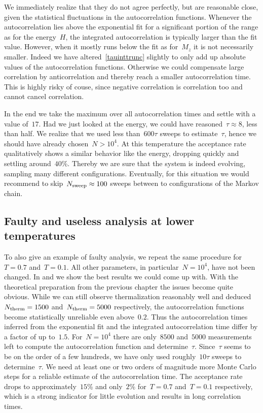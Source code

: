 We immediately realize that they do not agree perfectly, but are reasonable
close, given the statistical fluctuations in the autocorrelation functions.
Whenever the autocorrelation lies above the exponential fit for a significant
portion of the range as for the energy~$H$, the integrated autocorrelation is
typically larger than the fit value. However, when it mostly runs below the fit
as for~$M_z$ it is not necessarily smaller. Indeed we have
altered~\eqref{tauinttrunc} slightly to only add up absolute values of the
autocorrelation functions. Otherwise we could compensate large correlation by
anticorrelation and thereby reach a smaller autocorrelation time. This is highly
risky of couse, since negative correlation is correlation too and cannot cancel
correlation.

In the end we take the maximum over all autocorrelation times and settle with a
value of~$17$. Had we just looked at the energy, we could have reasoned~$\tau
\approx 8$, less than half. We realize that we used less than~$600 \tau$ sweeps
to estimate~$\tau$, hence we should have already chosen~$N > 10^4$. At this
temperature the acceptance rate qualitatively shows a similar behavior like the
energy, dropping quickly and settling around~$40$\%. Thereby we are sure that
the system is indeed evolving, sampling many different configurations.
Eventually, for this situation we would recommend to skip~$N_{\mathrm{sweep}} \approx 100$
sweeps between to configurations of the Markov chain.

\subsection{Faulty and useless analysis at lower temperatures}

To also give an example of faulty analysis, we repeat the same procedure
for~$T=0.7$ and~$T=0.1$. All other parameters, in particular~$N=10^4$, have not
been changed. In  and  we show the best
results we could come up with. With the theoretical preparation from the
previous chapter the issues become quite obvious. While we can still observe
thermalization reasonably well and deduced~$N_{\mathrm{therm}}=1500$ and~$N_{\mathrm{therm}}=5000$
respectively, the autocorrelation functions become statistically unreliable even
above~$0.2$. Thus the autocorrelation times inferred from the exponential fit
and the integrated autocorrelation time differ by a factor of up to~$1.5$.
For~$N=10^4$ there are only~$8500$ and~$5000$ measurements left to compute the
autocorrelation function and determine~$\tau$. Since~$\tau$ seems to be on the
order of a few hundreds, we have only used roughly~$10 \tau$ sweeps to
determine~$\tau$. We need at least one or two orders of magnitude more Monte
Carlo steps for a reliable estimate of the autocorrelation time. The acceptance
rate drops to approximately~$15$\% and only~$2$\% for~$T=0.7$ and~$T=0.1$
respectively, which is a strong indicator for little evolution and results in
long correlation times.


